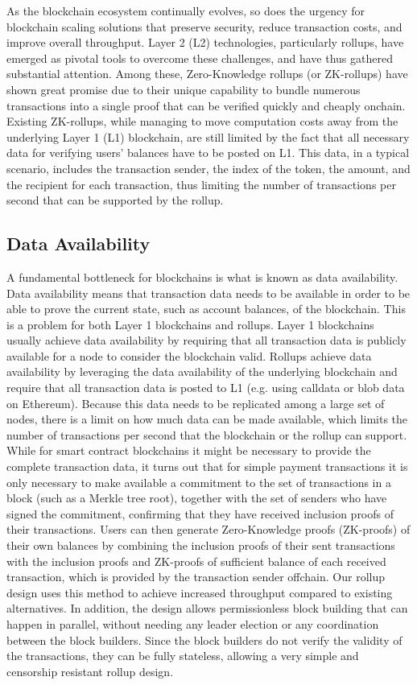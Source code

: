 As the blockchain ecosystem continually evolves, so does the urgency for blockchain scaling solutions that preserve security, reduce transaction costs, and improve overall throughput. Layer 2 (L2) technologies, particularly rollups, have emerged as pivotal tools to overcome these challenges, and have thus gathered substantial attention. Among these, Zero-Knowledge rollups (or ZK-rollups) have shown great promise due to their unique capability to bundle numerous transactions into a single proof that can be verified quickly and cheaply onchain. Existing ZK-rollups, while managing to move computation costs away from the underlying Layer 1 (L1) blockchain, are still limited by the fact that all necessary data for verifying users' balances have to be posted on L1. This data, in a typical scenario, includes the transaction sender, the index of the token, the amount, and the recipient for each transaction, thus limiting the number of transactions per second that can be supported by the rollup.

\subsection{Data Availability}

A fundamental bottleneck for blockchains is what is known as data availability. Data availability means that transaction data needs to be available in order to be able to prove the current state, such as account balances, of the blockchain. This is a problem for both Layer 1 blockchains and rollups. Layer 1 blockchains usually achieve data availability by requiring that all transaction data is publicly available for a node to consider the blockchain valid. Rollups achieve data availability by leveraging the data availability of the underlying blockchain and require that all transaction data is posted to L1 (e.g. using calldata or blob data on Ethereum). Because this data needs to be replicated among a large set of nodes, there is a limit on how much data can be made available, which limits the number of transactions per second that the blockchain or the rollup can support. While for smart contract blockchains it might be necessary to provide the complete transaction data, it turns out that for simple payment transactions it is only necessary to make available a commitment to the set of transactions in a block (such as a Merkle tree root), together with the set of senders who have signed the commitment, confirming that they have received inclusion proofs of their transactions. Users can then generate Zero-Knowledge proofs (ZK-proofs) of their own balances by combining the inclusion proofs of their sent transactions with the inclusion proofs and ZK-proofs of sufficient balance of each received transaction, which is provided by the transaction sender offchain. Our rollup design uses this method to achieve increased throughput compared to existing alternatives. In addition, the design allows permissionless block building that can happen in parallel, without needing any leader election or any coordination between the block builders. Since the block builders do not verify the validity of the transactions, they can be fully stateless, allowing a very simple and censorship resistant rollup design.


